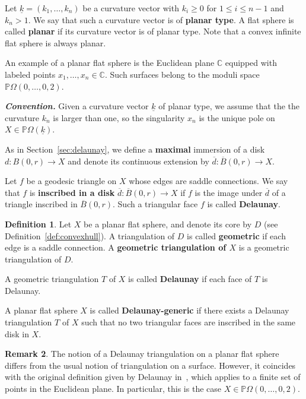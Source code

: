 \documentclass{compositio}
\numberwithin{equation}{section}
\numberwithin{figure}{section}
\theoremstyle{definition}
\newtheorem{definition}{Definition}[section]
\newtheorem{remark}[definition]{Remark}
\theoremstyle{plain}
\begin{document}
{Let $\underline{k} = (k_1,\ldots,k_n)$ be a curvature vector with $k_i \ge 0$ for $1 \le i \le n-1$ and $k_n > 1$. We say that such a curvature vector is of \textbf{planar type}. A flat sphere is called \textbf{planar} if its curvature vector is of planar type. Note that a convex infinite flat sphere is always planar.

An example of a planar flat sphere is the Euclidean plane $\mathbb{C}$ equipped with labeled points $x_1, \ldots, x_n \in \mathbb{C}$. Such surfaces belong to the moduli space $\mathbb{P}\Omega(0,\ldots,0,2)$.\newline


\noindent\textit{{\textbf{Convention.}}} Given a curvature vector $\underline{k}$ of planar type, we assume that the the curvature $k_n$ is larger than one, so the singularity $x_n$ is the unique pole on $X\in \mathbb{P}\Omega(\underline{k})$.\newline

As in Section~\ref{sec:delaunay}, we define a \textbf{maximal} immersion of a disk $d: B(0,r) \to X$ and denote its continuous extension by $\overline{d}: \overline{B}(0,r) \to X$. 

Let $f$ be a geodesic triangle on $X$ whose edges are saddle connections. We say that $f$ is \textbf{inscribed in a disk} $\overline{d}: \overline{B}(0, r) \to X$ if $f$ is the image under $\overline{d}$ of a triangle inscribed in $\overline{B}(0, r)$. Such a triangular face $f$ is called \textbf{Delaunay}.

\begin{definition}
    Let $X$ be a planar flat sphere, and denote its core by $D$ (see Definition~\ref{def:convexhull}). A triangulation of $D$ is called \textbf{geometric} if each edge is a saddle connection.  A \textbf{geometric triangulation of $X$} is a geometric triangulation of $D$.

    A geometric triangulation $T$ of $X$ is called \textbf{Delaunay} if each face of $T$ is Delaunay.

    A planar flat sphere $X$ is called \textbf{Delaunay-generic} if there exists a Delaunay triangulation $T$ of $X$ such that no two triangular faces are inscribed in the same disk in $X$.
\end{definition}

\begin{remark}
The notion of a Delaunay triangulation on a planar flat sphere differs from the usual notion of triangulation on a surface. However, it coincides with the original definition given by Delaunay in~\cite{Delaunay}, which applies to a finite set of points in the Euclidean plane. In particular, this is the case $X \in \mathbb{P}\Omega(0,\ldots,0,2)$.
\end{remark}

}
\end{document}

